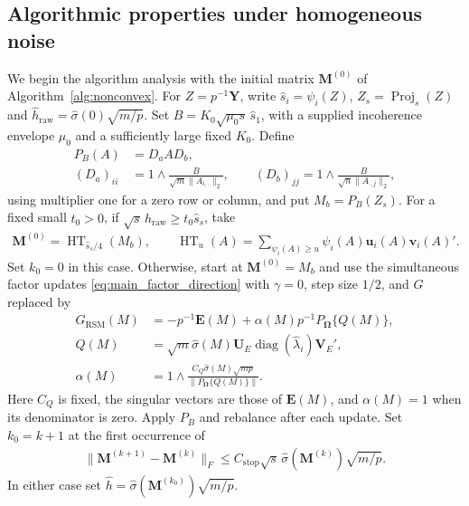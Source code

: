 \documentclass[numsec,webpdf,modern,large,namedate]{oup-authoring-template}
\theoremstyle{plain}
\theoremstyle{remark}
\newcommand{\M}{\bm{M}}
\newcommand{\Y}{\bm{Y}}
\newcommand{\bOmega}{\bm{\Omega}}
\newcommand{\U}{\bm{U}}
\newcommand{\V}{\bm{V}}
\newcommand{\bu}{\bm{u}}
\newcommand{\bv}{\bm{v}}
\newif\ifmarkchanges
\newenvironment{revision}{\begingroup\ifmarkchanges\color{red}\fi}{\endgroup}
\begin{document}
\begin{revision}
\subsection{Algorithmic properties under homogeneous noise}
\label{sec:4.3}

We begin the algorithm analysis with the initial matrix $\M^{(0)}$ of
Algorithm~\ref{alg:nonconvex}.
For $Z=p^{-1}\Y$, write $\widehat s_i=\psi_i(Z)$,
$Z_s=\operatorname{Proj}_s(Z)$ and
$\widehat h_{\mathrm{raw}}=\widehat\sigma(0)\sqrt{m/p}$.
Set $B=K_0\sqrt{\mu_0s}\,\widehat s_1$, with a supplied incoherence
envelope $\mu_0$ and a sufficiently large fixed $K_0$. Define
\begin{align}
 P_B(A)&=D_aAD_b,\nonumber\\
 (D_a)_{ii}&=1\wedge\frac{B}{\sqrt m\|A_{i,\cdot}\|_2},\qquad
 (D_b)_{jj}=1\wedge\frac{B}{\sqrt n\|A_{\cdot,j}\|_2},
 \label{eq:main_initial_projection}
\end{align}
using multiplier one for a zero row or column, and put $M_b=P_B(Z_s)$.
For a fixed small $t_0>0$, if
$\sqrt s\,\widehat h_{\mathrm{raw}}\ge t_0\widehat s_s$, take
\begin{align}
 \M^{(0)}=\operatorname{HT}_{\widehat s_s/4}(M_b),\qquad
 \operatorname{HT}_u(A)=\sum_{\psi_i(A)\ge u}\psi_i(A)\bu_i(A)\bv_i(A)'.
 \label{eq:main_initial_spectral_branch}
\end{align}
Set $k_0=0$ in this case. Otherwise, start at $\M^{(0)}=M_b$ and use the simultaneous factor
updates \eqref{eq:main_factor_direction} with $\gamma=0$, step size $1/2$,
and $G$ replaced by
\begin{align}
 G_{\mathrm{RSM}}(M)
 &=-p^{-1}\bm E(M)+\alpha(M)p^{-1}P_{\bOmega}\{Q(M)\},\nonumber\\
 Q(M)&=\sqrt m\widehat\sigma(M)\U_E
                   \operatorname{diag}(\widehat\lambda_i)\V_E',\nonumber\\
 \alpha(M)&=1\wedge
 \frac{C_Q\widehat\sigma(M)\sqrt{mp}}{\|P_{\bOmega}\{Q(M)\}\|}.
 \label{eq:main_initial_score}
\end{align}
Here $C_Q$ is fixed, the singular vectors are those of $\bm E(M)$,
and $\alpha(M)=1$ when its denominator is zero. Apply $P_B$
and rebalance after each update. Set $k_0=k+1$ at the first occurrence of
\begin{align}
 \|\M^{(k+1)}-\M^{(k)}\|_F
 \le C_{\mathrm{stop}}\sqrt s\,
                \widehat\sigma(\M^{(k)})\sqrt{m/p}.
 \label{eq:main_initial_stop}
\end{align}
In either case set $\widehat h=\widehat\sigma(\M^{(k_0)})\sqrt{m/p}$.


\end{revision}
\end{document}
